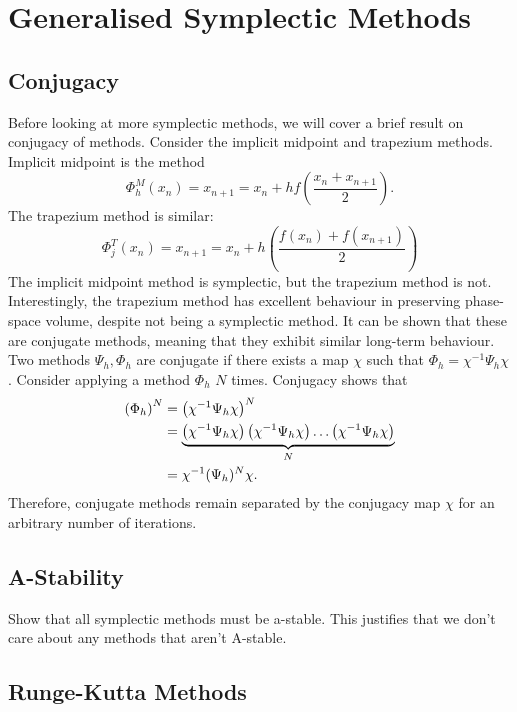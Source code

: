 \section{Generalised Symplectic Methods}

\subsection{Conjugacy}

Before looking at more symplectic methods, we will cover a brief result on conjugacy of methods.
Consider the implicit midpoint and trapezium methods. Implicit midpoint is the method
\begin{equation*}
	\Phi_h^M (x_n) = x_{n+1} = x_n + hf\left(\frac{x_n + x_{n+1}}{2}\right).
\end{equation*}
The trapezium method is similar:
\begin{equation*}
	\Phi_j^T (x_n) = x_{n+1} = x_n + h \left(\frac{f(x_n) + f(x_{n+1})}{2}\right)
\end{equation*}
The implicit midpoint method is symplectic, but the trapezium method is not.
Interestingly, the trapezium method has excellent behaviour in preserving phase-space volume, despite not being a symplectic method.
It can be shown that these are conjugate methods, meaning that they exhibit similar long-term behaviour.
Two methods $\Psi_h, \Phi_h$ are conjugate if there exists a map $\chi$ such that $\Phi_h = \chi^{-1} \Psi_h \chi$.
Consider applying a method $\Phi_h$ $N$ times. Conjugacy shows that
\begin{align*}
	\left(\Phi_h\right)^N &= \left(\chi^{-1} \Psi_h \chi\right)^N \\
	&= \underbrace{\left(\chi^{-1} \Psi_h \chi \right)\left(\chi^{-1} \Psi_h \chi \right) \mathellipsis \left(\chi^{-1} \Psi_h \chi\right)}_{N} \\
	&= \chi^{-1} (\Psi_h)^N \chi.
\end{align*}
Therefore, conjugate methods remain separated by the conjugacy map $\chi$ for an arbitrary number of iterations.

\subsection{A-Stability}

Show that all symplectic methods must be a-stable.
This justifies that we don't care about any methods that aren't A-stable.

\subsection{Runge-Kutta Methods}

